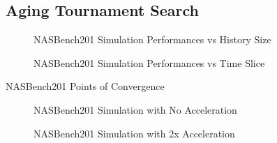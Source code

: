 \documentclass[twocolumn]{article}
\begin{document}
\FloatBarrier
\subsection{Aging Tournament Search}

\begin{figure}[!h]
    \begin{center}
        
    \end{center}
    \caption{NASBench201 Simulation Performances vs History Size}
    \label{fig:nasbench_best_perf_vs_size}
\end{figure}

\begin{figure}
    \begin{center}
        
    \end{center}
    \caption{NASBench201 Simulation Performances vs Time Slice}
    \label{fig:nasbench_best_perf_vs_slice}
\end{figure}

\begin{table}
    \begin{center}
        \caption{NASBench201 Points of Convergence}
        \label{table:full_sim_nasnet_convergence}
    \end{center}
\end{table}

\begin{figure}
    \begin{center}
        
    \end{center}
    \caption{NASBench201 Simulation with No Acceleration}
    \label{fig:evo_nasbench_1x_acceleration}
\end{figure}

\begin{figure}
    \begin{center}
        
    \end{center}
    \caption{NASBench201 Simulation with 2x Acceleration}
    \label{fig:evo_nasbench_2x_acceleration}
\end{figure}
\end{document}
